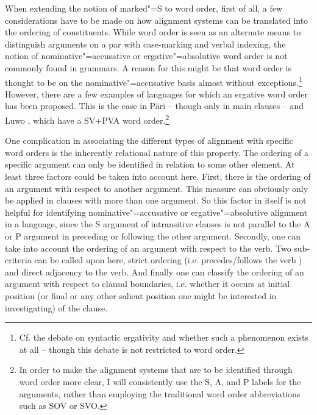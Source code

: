 When extending the notion of marked"=S to word order, first of all, a few considerations have to be made on how alignment systems can be translated into the ordering of constituents.
While word order is seen as an alternate means to distinguish arguments on a par with case-marking and verbal indexing, the notion of nominative"=accusative or ergative"=absolutive word order is not commonly found in grammars.
A reason for this might be that word order is thought to be on the nominative"=accusative basis almost without exceptions.\footnote{Cf. the debate on syntactic ergativity \citep{Anderson:1976,Anderson:1977, Dixon:1994} and whether such a phenomenon exists at all -- though this debate is not restricted to word order.}
However, there are a few examples of languages for which an ergative word order has been proposed.
This is the case in P\"ari \citep{Andersen:1988} -- though only in main clauses -- and Luwo \citep{Buth:1981}, which have a SV+PVA word order.\footnote{In order to make the alignment systems that are to be identified through word order more clear, I will consistently use the S, A, and P labels for the arguments, rather than employing the traditional word order abbreviations such as SOV or SVO.} 

One complication in associating the different types of alignment with specific word orders is the inherently relational nature of this property.
The ordering of a specific argument can only be identified in relation to some other element.
At least three factors could be taken into account here.
First, there is the ordering of an argument with respect to another argument. 
This measure can obviously only be applied in clauses with more than one argument.
So this factor in itself is not helpful for identifying nominative"=accusative or ergative"=absolutive alignment in a language, since the S argument of intransitive clauses is not parallel to the A or P argument in preceding or following the other argument. %
Secondly, one can take into account the ordering of an argument with respect to the verb. %
Two sub-criteria can be called upon here, strict ordering (i.e. precedes/follows the verb%
) and direct adjacency to the verb. %
And finally one can classify the ordering of an argument with respect to clausal boundaries, %
i.e. whether it occurs at initial position (or final or any other salient position one might be interested in investigating) of the clause.


